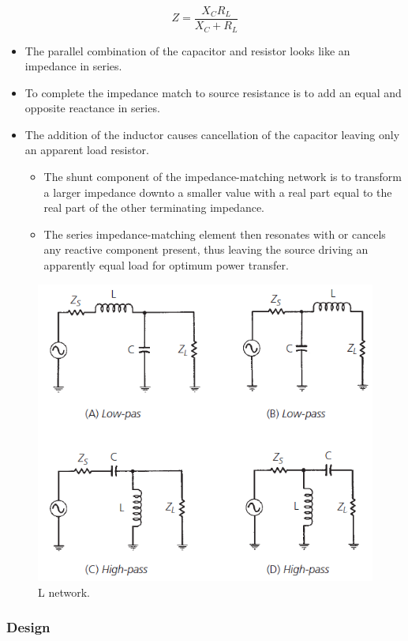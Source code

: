 \begin{equation}
Z = \dfrac{X_C R_L}{X_C+R_L}
\end{equation}

\begin{itemize}
	\item The parallel combination of the capacitor and resistor looks like an impedance in series.
	\item To complete the impedance match to source resistance is to add an equal and opposite reactance in series.
	\item The addition of the inductor causes cancellation of the capacitor leaving only an apparent load resistor.
	\begin{itemize}
		\item The shunt component of the impedance-matching network is to transform a larger impedance downto a smaller value with a real part equal to the real part of the other terminating impedance.
		\item The series impedance-matching element then resonates with or cancels any reactive component present, thus leaving the source driving an apparently equal load for optimum power transfer.
	\end{itemize}
\end{itemize}


\begin{figure} [H]
	\centering
	\includegraphics[width=0.8\linewidth]{graphics/26.png}
	\caption{L network.}
	\label{fig:26}
\end{figure}

\newpage\subsubsection{Design}

